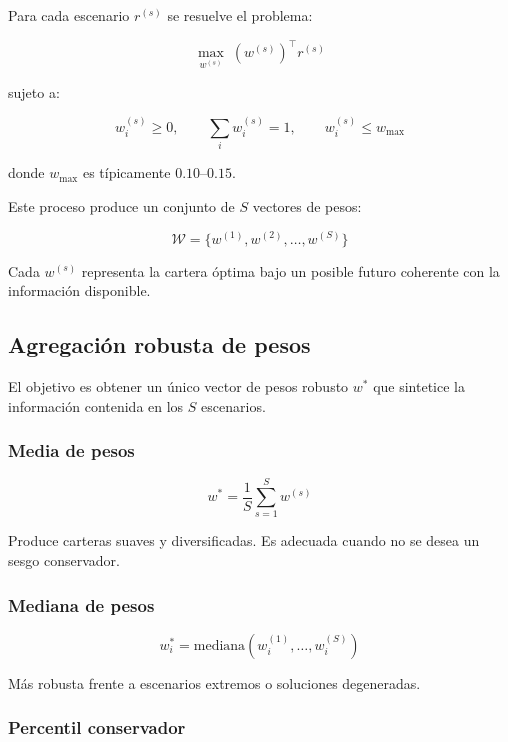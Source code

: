 \documentclass[12pt]{article}
\begin{document}
Para cada escenario $r^{(s)}$ se resuelve el problema:



\[
\max_{w^{(s)}} \; (w^{(s)})^\top r^{(s)}
\]



sujeto a:



\[
w^{(s)}_i \ge 0, \qquad \sum_i w^{(s)}_i = 1, \qquad w^{(s)}_i \le w_{\max}
\]



donde $w_{\max}$ es típicamente $0.10$–$0.15$.

Este proceso produce un conjunto de $S$ vectores de pesos:



\[
\mathcal{W} = \{ w^{(1)}, w^{(2)}, \dots, w^{(S)} \}
\]



Cada $w^{(s)}$ representa la cartera óptima bajo un posible futuro coherente con la información disponible.

\subsection{Agregación robusta de pesos}

El objetivo es obtener un único vector de pesos robusto $w^\ast$ que sintetice la información contenida en los $S$ escenarios.

\subsubsection{Media de pesos}



\[
w^\ast = \frac{1}{S} \sum_{s=1}^S w^{(s)}
\]



Produce carteras suaves y diversificadas.  
Es adecuada cuando no se desea un sesgo conservador.

\subsubsection{Mediana de pesos}



\[
w^\ast_i = \text{mediana}\left( w^{(1)}_i, \dots, w^{(S)}_i \right)
\]



Más robusta frente a escenarios extremos o soluciones degeneradas.

\subsubsection{Percentil conservador}
\end{document}
